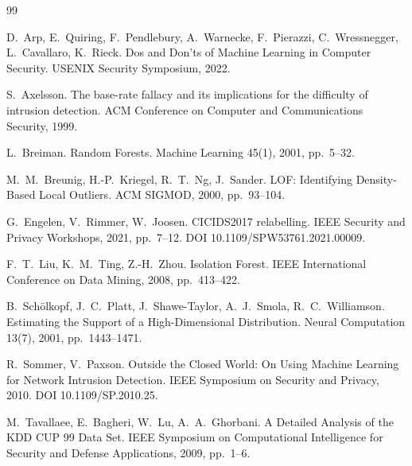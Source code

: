 \documentclass[10pt]{article}
\begin{document}
\begin{thebibliography}{99}\small

 D.~Arp, E.~Quiring, F.~Pendlebury, A.~Warnecke, F.~Pierazzi, C.~Wressnegger, L.~Cavallaro,
K.~Rieck. Dos and Don'ts of Machine Learning in Computer Security. USENIX Security Symposium, 2022.

 S.~Axelsson. The base-rate fallacy and its implications for the difficulty of intrusion
detection. ACM Conference on Computer and Communications Security, 1999.

 L.~Breiman. Random Forests. Machine Learning 45(1), 2001, pp.~5--32.

 M.~M.~Breunig, H.-P.~Kriegel, R.~T.~Ng, J.~Sander. LOF: Identifying Density-Based Local
Outliers. ACM SIGMOD, 2000, pp.~93--104.

 G.~Engelen, V.~Rimmer, W.~Joosen. CICIDS2017 relabelling. IEEE Security and Privacy
Workshops, 2021, pp.~7--12. DOI 10.1109/SPW53761.2021.00009.

 F.~T.~Liu, K.~M.~Ting, Z.-H.~Zhou. Isolation Forest. IEEE International Conference on Data
Mining, 2008, pp.~413--422.

 B.~Sch\"olkopf, J.~C.~Platt, J.~Shawe-Taylor, A.~J.~Smola, R.~C.~Williamson. Estimating the
Support of a High-Dimensional Distribution. Neural Computation 13(7), 2001, pp.~1443--1471.

 R.~Sommer, V.~Paxson. Outside the Closed World: On Using Machine Learning for Network
Intrusion Detection. IEEE Symposium on Security and Privacy, 2010. DOI 10.1109/SP.2010.25.

 M.~Tavallaee, E.~Bagheri, W.~Lu, A.~A.~Ghorbani. A Detailed Analysis of the KDD CUP 99 Data
Set. IEEE Symposium on Computational Intelligence for Security and Defense Applications, 2009, pp.~1--6.

\end{thebibliography}
\end{document}
